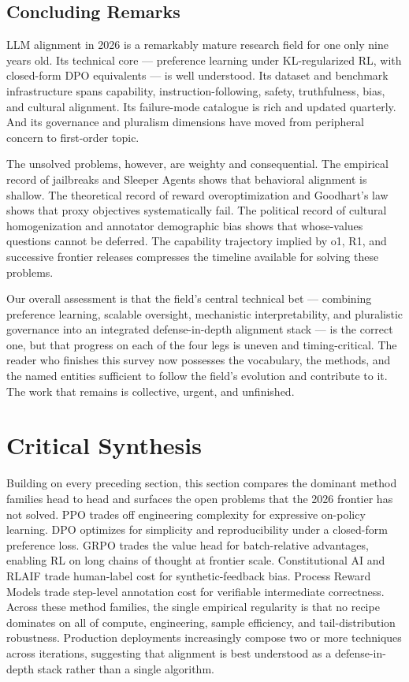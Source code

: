 \subsection{Concluding Remarks}\label{concluding-remarks}

LLM alignment in 2026 is a remarkably mature research field for one only nine years old. Its technical core --- preference learning under KL-regularized RL, with closed-form DPO equivalents --- is well understood. Its dataset and benchmark infrastructure spans capability, instruction-following, safety, truthfulness, bias, and cultural alignment. Its failure-mode catalogue is rich and updated quarterly. And its governance and pluralism dimensions have moved from peripheral concern to first-order topic.

The unsolved problems, however, are weighty and consequential. The empirical record of jailbreaks and Sleeper Agents shows that behavioral alignment is shallow. The theoretical record of reward overoptimization and Goodhart's law shows that proxy objectives systematically fail. The political record of cultural homogenization and annotator demographic bias shows that whose-values questions cannot be deferred. The capability trajectory implied by o1, R1, and successive frontier releases compresses the timeline available for solving these problems.

Our overall assessment is that the field's central technical bet --- combining preference learning, scalable oversight, mechanistic interpretability, and pluralistic governance into an integrated defense-in-depth alignment stack --- is the correct one, but that progress on each of the four legs is uneven and timing-critical. The reader who finishes this survey now possesses the vocabulary, the methods, and the named entities sufficient to follow the field's evolution and contribute to it. The work that remains is collective, urgent, and unfinished.

\section{Critical Synthesis}\label{critical-synthesis}

Building on every preceding section, this section compares the dominant method families head to head and surfaces the open problems that the 2026 frontier has not solved. PPO trades off engineering complexity for expressive on-policy learning. DPO optimizes for simplicity and reproducibility under a closed-form preference loss. GRPO trades the value head for batch-relative advantages, enabling RL on long chains of thought at frontier scale. Constitutional AI and RLAIF trade human-label cost for synthetic-feedback bias. Process Reward Models trade step-level annotation cost for verifiable intermediate correctness. Across these method families, the single empirical regularity is that no recipe dominates on all of compute, engineering, sample efficiency, and tail-distribution robustness. Production deployments increasingly compose two or more techniques across iterations, suggesting that alignment is best understood as a defense-in-depth stack rather than a single algorithm.

